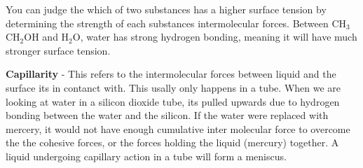 \documentclass{article}
\begin{document}
\noindent You can judge the which of two substances has a higher surface tension  by determining the strength of each substances intermolecular forces. Between CH$_3$CH$_2$OH and H$_2$O, water has strong hydrogen bonding, meaning it will have much stronger surface tension.\\
\begin{minipage}{9.5cm}
	\textbf{Capillarity} - This refers to the intermolecular forces between liquid and the surface its in contanct with. This usally only happens in a tube. When we are looking at water in a silicon dioxide tube, its pulled upwards due to hydrogen bonding between the water and the silicon. If the water were replaced with mercery, it would not have enough cumulative inter molecular force to overcome the the cohesive forces, or the forces holding the liquid (mercury) together. A liquid undergoing capillary action in a tube will form a meniscus.  


\end{minipage}
\end{document}
